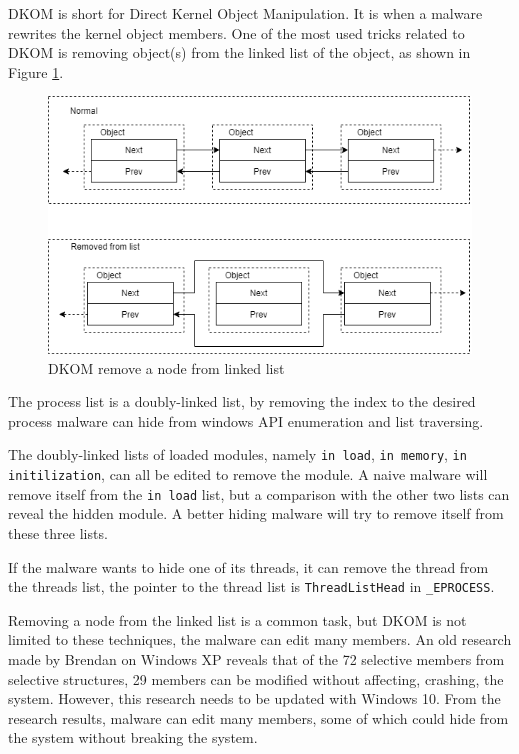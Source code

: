 DKOM is short for Direct Kernel Object Manipulation. It is when a malware
rewrites the kernel object members. One of the most used tricks related to DKOM
is removing object(s) from the linked list of the object, as shown in Figure
\ref{fig:dkom}.

\begin{figure}[h]
  \centering
  \caption{DKOM remove a node from linked list}
  \label{fig:dkom}
  \includegraphics[scale=0.7]{images/dkom.png}
\end{figure}

The process list is a doubly-linked list, by removing the index to the desired
process malware can hide from windows API enumeration and list traversing.

The doubly-linked lists of loaded modules, namely \texttt{in load}, \texttt{in
memory}, \texttt{in initilization}, can all be edited to remove the module. A
naive malware will remove itself from the \texttt{in load} list, but a
comparison with the other two lists can reveal the hidden module. A better
hiding malware will try to remove itself from these three lists.

If the malware wants to hide one of its threads, it can remove the thread from
the threads list, the pointer to the thread list is \texttt{ThreadListHead} in
\texttt{\_EPROCESS}.

Removing a node from the linked list is a common task, but DKOM is not limited
to these techniques, the malware can edit many members. An old
research\cite{robussignature} made by Brendan on Windows XP reveals that of the
72 selective members from selective structures, 29 members can be modified
without affecting, crashing, the system.  However, this research needs to be
updated with Windows 10. From the research results, malware can edit many
members, some of which could hide from the system without breaking the system.

